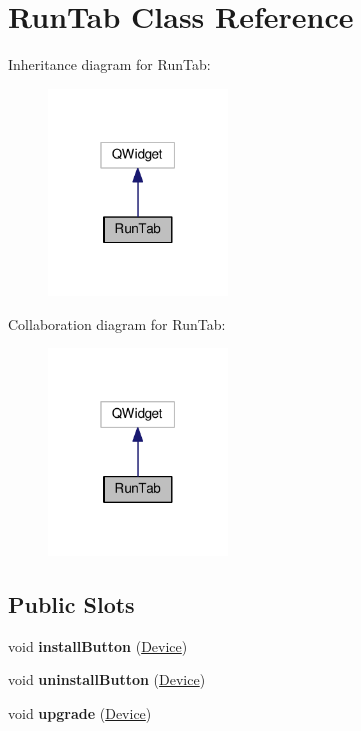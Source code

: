 \hypertarget{classRunTab}{}\section{Run\+Tab Class Reference}
\label{classRunTab}


Inheritance diagram for Run\+Tab\+:\nopagebreak
\begin{figure}[H]
\begin{center}
\leavevmode
\includegraphics[width=135pt]{classRunTab__inherit__graph}
\end{center}
\end{figure}


Collaboration diagram for Run\+Tab\+:\nopagebreak
\begin{figure}[H]
\begin{center}
\leavevmode
\includegraphics[width=135pt]{classRunTab__coll__graph}
\end{center}
\end{figure}
\subsection*{Public Slots}
\begin{DoxyCompactItemize}
\item 
\mbox{\label{classRunTab_a365c10b3ea780707cfe7a78914570698}} 
void {\bfseries install\+Button} (\hyperlink{classDevice}{Device})
\item 
\mbox{\label{classRunTab_ad7c9fdbc6697b8ba55059c9c32abef3e}} 
void {\bfseries uninstall\+Button} (\hyperlink{classDevice}{Device})
\item 
\mbox{\label{classRunTab_a7f6949dfb2b64fd5b39844a7487257bf}} 
void {\bfseries upgrade} (\hyperlink{classDevice}{Device})
\end{DoxyCompactItemize}
